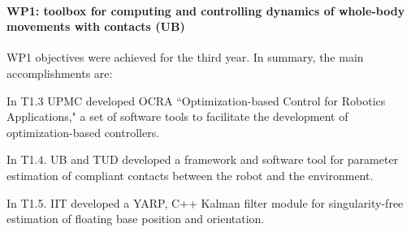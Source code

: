 
\paragraph*{WP1: toolbox for computing and controlling dynamics of whole-body movements with contacts (UB)}
WP1 objectives were achieved for the third year.  In summary, the main
accomplishments are:

In T1.3 UPMC developed OCRA ``Optimization-based Control for Robotics Applications," a set of software tools to facilitate the development of optimization-based controllers.

In T1.4. UB and TUD developed a framework and software tool for parameter estimation of compliant contacts between the robot and the environment. 

In T1.5. IIT developed a YARP, C++ Kalman filter module for  singularity-free estimation of floating base position and orientation. 